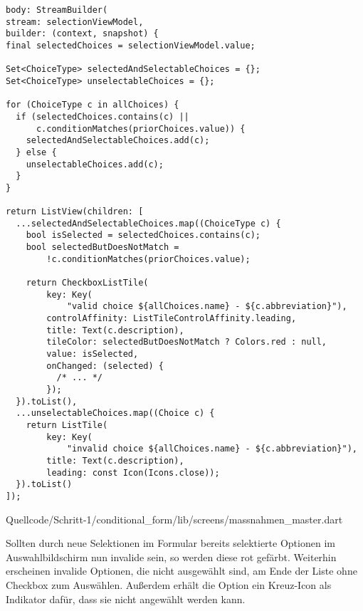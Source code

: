 \begin{listing}[htbp]
\ifIncludeFigures
\let\oldtheFancyVerbLine\theFancyVerbLine
  \renewcommand\theFancyVerbLine{%
    \ifnum\value{FancyVerbLine}=121
    \setcounter{FancyVerbLine}{131}
    \else
    \oldtheFancyVerbLine%
    \fi
  }
  \begin{verbatim}
body: StreamBuilder(
stream: selectionViewModel,
builder: (context, snapshot) {
final selectedChoices = selectionViewModel.value;

Set<ChoiceType> selectedAndSelectableChoices = {};
Set<ChoiceType> unselectableChoices = {};

for (ChoiceType c in allChoices) {
  if (selectedChoices.contains(c) ||
      c.conditionMatches(priorChoices.value)) {
    selectedAndSelectableChoices.add(c);
  } else {
    unselectableChoices.add(c);
  }
}

return ListView(children: [
  ...selectedAndSelectableChoices.map((ChoiceType c) {
    bool isSelected = selectedChoices.contains(c);
    bool selectedButDoesNotMatch =
        !c.conditionMatches(priorChoices.value);

    return CheckboxListTile(
        key: Key(
            "valid choice ${allChoices.name} - ${c.abbreviation}"),
        controlAffinity: ListTileControlAffinity.leading,
        title: Text(c.description),
        tileColor: selectedButDoesNotMatch ? Colors.red : null,
        value: isSelected,
        onChanged: (selected) {
          /* ... */
        });
  }).toList(),
  ...unselectableChoices.map((Choice c) {
    return ListTile(
        key: Key(
            "invalid choice ${allChoices.name} - ${c.abbreviation}"),
        title: Text(c.description),
        leading: const Icon(Icons.close));
  }).toList()
]);
\end{verbatim}
\fi
   {Quellcode/Schritt-1/conditional_form/lib/screens/massnahmen_master.dart}
  \label{lst:Schritt4selectedAndSelectableChoices}
\end{listing}









Sollten durch neue Selektionen im Formular bereits selektierte Optionen im Auswahlbildschirm nun invalide sein,
so werden diese rot gefärbt.
Weiterhin erscheinen invalide Optionen,
die nicht ausgewählt sind,
am Ende der Liste ohne Checkbox zum Auswählen.
Außerdem erhält die Option ein Kreuz-Icon als Indikator dafür,
dass sie nicht angewählt werden kann.

